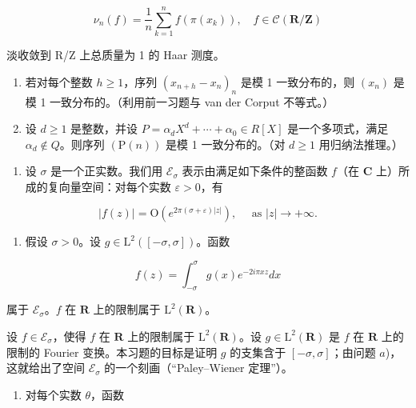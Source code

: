 \[
\nu_ {n} (f) = \frac {1}{n} \sum_ {k = 1} ^ {n} f (\pi (x _ {k})), \quad f \in \mathscr {C} (\mathbf {R} / \mathbf {Z})
\]

淡收敛到 R/Z 上总质量为 1 的 Haar 测度。

\begin{enumerate}
\def\labelenumi{\alph{enumi})}
\setcounter{enumi}{1}
\item
  若对每个整数 \(h \geqslant 1\)，序列 \((x_{n+h} - x_n)_n\) 是模 1 一致分布的，则 \((x_n)\) 是模 1 一致分布的。（利用前一习题与 van der Corput 不等式。）
\item
  设 \(d \geqslant 1\) 是整数，并设 \(P = \alpha_{d} X^{d} + \cdots + \alpha_{0} \in R[X]\) 是一个多项式，满足 \(\alpha_{d} \notin Q\)。则序列 \((\mathrm{P}(n))\) 是模 1 一致分布的。（对 \(d \geqslant 1\) 用归纳法推理。）
\end{enumerate}

\begin{enumerate}
\def\labelenumi{\arabic{enumi})}
\setcounter{enumi}{35}
\tightlist
\item
  设 \(\sigma\) 是一个正实数。我们用 \(\mathcal{E}_{\sigma}\) 表示由满足如下条件的整函数 \(f\)（在 \(\mathbf{C}\) 上）所成的复向量空间：对每个实数 \(\varepsilon > 0\)，有
\end{enumerate}

\[
| f (z) | = \mathrm{O} (e ^ {2 \pi (\sigma + \varepsilon) | z |}), \quad \text { as } | z | \to + \infty .
\]

\begin{enumerate}
\def\labelenumi{\alph{enumi})}
\tightlist
\item
  假设 \(\sigma > 0\)。设 \(g \in \mathrm{L}^2([- \sigma, \sigma])\)。函数
\end{enumerate}

\[
f (z) = \int_ {- \sigma} ^ {\sigma} g (x) e ^ {- 2 i \pi x z} d x
\]

属于 \(\mathcal{E}_{\sigma}\)。\(f\) 在 \(\mathbf{R}\) 上的限制属于 \(\mathrm{L}^2 (\mathbf{R})\)。

设 \(f \in \mathcal{E}_{\sigma}\)，使得 \(f\) 在 \(\mathbf{R}\) 上的限制属于 \(\mathrm{L}^2(\mathbf{R})\)。设 \(g \in \mathrm{L}^2(\mathbf{R})\) 是 \(f\) 在 \(\mathbf{R}\) 上的限制的 Fourier 变换。本习题的目标是证明 \(g\) 的支集含于 \([-\sigma, \sigma]\)；由问题 \(a\))，这就给出了空间 \(\mathcal{E}_{\sigma}\) 的一个刻画（“Paley–Wiener 定理”）。

\begin{enumerate}
\def\labelenumi{\alph{enumi})}
\setcounter{enumi}{1}
\tightlist
\item
  对每个实数 \(\theta\)，函数
\end{enumerate}

